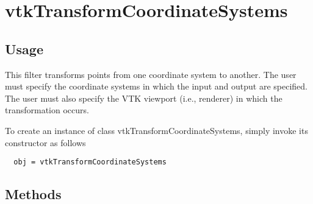 \section{vtkTransformCoordinateSystems}

\subsection{Usage}

 This filter transforms points from one coordinate system to another. The user
 must specify the coordinate systems in which the input and output are
 specified. The user must also specify the VTK viewport (i.e., renderer) in
 which the transformation occurs.


To create an instance of class vtkTransformCoordinateSystems, simply
invoke its constructor as follows
\begin{verbatim}
  obj = vtkTransformCoordinateSystems
\end{verbatim}
\subsection{Methods}

